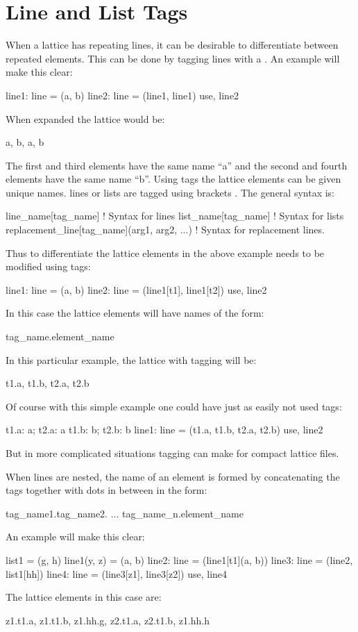 \section{Line and List Tags}
\label{s:tag}

When a lattice has repeating lines, it can be desirable to differentiate
between repeated elements. This can be done by tagging lines with a . 
An example will make this clear:
\begin{example}
  line1: line = (a, b)
  line2: line = (line1, line1)
  use, line2
\end{example}
When expanded the lattice would be:
\begin{example}
  a, b, a, b
\end{example}
The first and third elements have the same name ``a'' and the second and fourth
elements have the same name ``b''. Using tags the lattice elements can be given
unique names. lines or lists are tagged  
using brackets \vn{[...]}. The general syntax is:
\begin{example}
  line_name[tag_name]                           ! Syntax for lines
  list_name[tag_name]                           ! Syntax for lists
  replacement_line[tag_name](arg1, arg2, ...)   ! Syntax for replacement lines.
\end{example}
Thus to differentiate the lattice elements in the above example  needs to
be modified using tags:
\begin{example}
  line1: line = (a, b)
  line2: line = (line1[t1], line1[t2])
  use, line2
\end{example}
In this case the lattice elements will have names of the form:
\begin{example}
  tag_name.element_name
\end{example}
In this particular example, the lattice with tagging will be:
\begin{example}
  t1.a, t1.b, t2.a, t2.b
\end{example}
Of course with this simple example one could have just as easily not used tags:
\begin{example}
  t1.a: a;   t2.a: a
  t1.b: b;   t2.b: b
  line1: line = (t1.a, t1.b, t2.a, t2.b)
  use, line2
\end{example}
But in more complicated situations tagging can make for compact lattice files.

When lines are nested, the name of an element is formed by concatenating the tags
together with dots in between in the form:
\begin{example}
  tag_name1.tag_name2. ... tag_name_n.element_name
\end{example}
An example will make this clear:
\begin{example}
  list1 = (g, h)
  line1(y, z) = (a, b)
  line2: line = (line1[t1](a, b))
  line3: line = (line2, list1[hh])
  line4: line = (line3[z1], line3[z2])
  use, line4
\end{example}
The lattice elements in this case are:
\begin{example}
  z1.t1.a, z1.t1.b, z1.hh.g, z2.t1.a, z2.t1.b, z1.hh.h 
\end{example}


